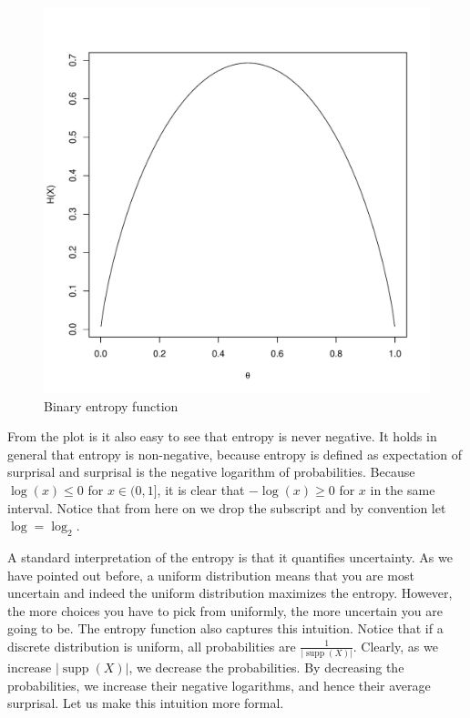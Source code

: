 \documentclass[a4paper,11pt,leqno]{report}\usepackage[]{graphicx}\usepackage[]{color}
\makeatletter
\def\maxwidth{ %
  \ifdim\Gin@nat@width>\linewidth
    \linewidth
  \else
    \Gin@nat@width
  \fi
}
\newenvironment{knitrout}{}{} %
\newcommand{\supp}{\operatorname{supp}}
\makeatother
\begin{document}
\begin{knitrout}
\color{fgcolor}\begin{figure}[t!]

{\centering \includegraphics[width=\maxwidth]{figure/binaryEntropy-1} 

}

\caption[Binary entropy function]{Binary entropy function}\label{fig:binaryEntropy}
\end{figure}


\end{knitrout}

From the plot is it also easy to see that entropy is never negative. It holds in general that entropy is non-negative,
because entropy is defined as expectation of surprisal and surprisal is the negative logarithm of probabilities. 
Because $ \log(x) \leq 0 $ for $ x \in (0,1] $, it is clear that $ -\log(x) \geq 0 $ for $ x $ in the same
interval. Notice that from here on we drop the subscript and by convention let $ \log = \log_{2} $.

A standard interpretation of the entropy is that it quantifies uncertainty. As we have pointed out before, a uniform distribution means that you are most uncertain and indeed the uniform distribution maximizes the entropy. However, the more choices you have to pick from uniformly, the more uncertain you are going to be.  The entropy function also captures this intuition. Notice that if a discrete distribution is uniform, all probabilities are $ \frac{1}{|\supp(X)|} $. Clearly, as we increase $ |\supp(X)| $, we decrease the probabilities. By decreasing the probabilities, we increase their negative logarithms, and hence their average surprisal. Let us make this intuition more formal.
\end{document}
